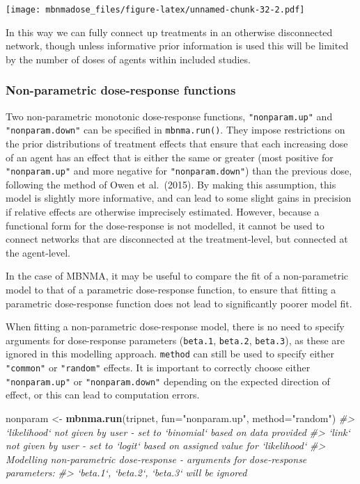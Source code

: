 \documentclass[]{article}
\newenvironment{Shaded}{\begin{snugshade}}{\end{snugshade}}
\newcommand{\CommentTok}[1]{\textcolor[rgb]{0.56,0.35,0.01}{\textit{#1}}}
\newcommand{\DataTypeTok}[1]{\textcolor[rgb]{0.13,0.29,0.53}{#1}}
\newcommand{\KeywordTok}[1]{\textcolor[rgb]{0.13,0.29,0.53}{\textbf{#1}}}
\newcommand{\NormalTok}[1]{#1}
\newcommand{\StringTok}[1]{\textcolor[rgb]{0.31,0.60,0.02}{#1}}
\begin{document}
\texttt{[image: mbnmadose\_files/figure-latex/unnamed-chunk-32-2.pdf]}

In this way we can fully connect up treatments in an otherwise
disconnected network, though unless informative prior information is
used this will be limited by the number of doses of agents within
included studies.

\hypertarget{non-parametric-dose-response-functions}{%
\subsubsection{Non-parametric dose-response
functions}\label{non-parametric-dose-response-functions}}

Two non-parametric monotonic dose-response functions,
\texttt{"nonparam.up"} and \texttt{"nonparam.down"} can be specified in
\texttt{mbnma.run()}. They impose restrictions on the prior
distributions of treatment effects that ensure that each increasing dose
of an agent has an effect that is either the same or greater (most
positive for \texttt{"nonparam.up"} and more negative for
\texttt{"nonparam.down"}) than the previous dose, following the method
of Owen et al.~(2015). By making this assumption, this model is slightly
more informative, and can lead to some slight gains in precision if
relative effects are otherwise imprecisely estimated. However, because a
functional form for the dose-response is not modelled, it cannot be used
to connect networks that are disconnected at the treatment-level, but
connected at the agent-level.

In the case of MBNMA, it may be useful to compare the fit of a
non-parametric model to that of a parametric dose-response function, to
ensure that fitting a parametric dose-response function does not lead to
significantly poorer model fit.

When fitting a non-parametric dose-response model, there is no need to
specify arguments for dose-response parameters (\texttt{beta.1},
\texttt{beta.2}, \texttt{beta.3}), as these are ignored in this
modelling approach. \texttt{method} can still be used to specify either
\texttt{"common"} or \texttt{"random"} effects. It is important to
correctly choose either \texttt{"nonparam.up"} or
\texttt{"nonparam.down"} depending on the expected direction of effect,
or this can lead to computation errors.

\begin{Shaded}
\begin{Highlighting}[]
\NormalTok{nonparam <-}\StringTok{ }\KeywordTok{mbnma.run}\NormalTok{(tripnet, }\DataTypeTok{fun=}\StringTok{"nonparam.up"}\NormalTok{, }\DataTypeTok{method=}\StringTok{"random"}\NormalTok{)}
\CommentTok{#> `likelihood` not given by user - set to `binomial` based on data provided}
\CommentTok{#> `link` not given by user - set to `logit` based on assigned value for `likelihood`}
\CommentTok{#> Modelling non-parametric dose-response - arguments for dose-response parameters:}
\CommentTok{#> `beta.1`, `beta.2`, `beta.3` will be ignored}
\end{Highlighting}
\end{Shaded}
\end{document}
